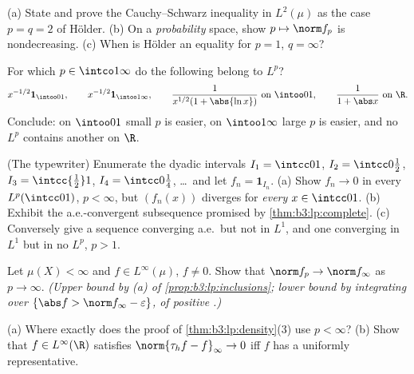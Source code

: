 \begin{exercise}[$\star$]\label{exo:b3:lp:1}
(a) State and prove the Cauchy--Schwarz inequality in
$L^2(\mu)$ as the case $p = q = 2$ of H\"older.
(b) On a \emph{probability} space, show $p \mapsto \norm f_p$
is nondecreasing.
(c) When is H\"older an equality for $p = 1$, $q = \infty$?
\end{exercise}

\begin{exercise}[$\star$]\label{exo:b3:lp:2}
For which $p \in \intco1\infty$ do the following belong to
$L^p$?
\[
x^{-1/2}\mathbf 1_{\intoo01},\qquad
x^{-1/2}\mathbf 1_{\intoo1\infty},\qquad
\frac{1}{x^{1/2}(1 + \abs{\ln x})}\ \text{on } \intoo01,
\qquad
\frac1{1 + \abs x}\ \text{on } \R .
\]
Conclude: on $\intoo01$ small $p$ is easier, on
$\intoo1\infty$ large $p$ is easier, and no $L^p$ contains
another on $\R$.
\end{exercise}

\begin{exercise}[$\star\star$]\label{exo:b3:lp:3}
(The typewriter) Enumerate the dyadic intervals $I_1 =
\intcc01$, $I_2 = \intcc0{\frac12}$, $I_3 = \intcc{\frac12}1$,
$I_4 = \intcc0{\frac14}$, \dots\ and let $f_n = \mathbf
1_{I_n}$.
(a) Show $f_n \to 0$ in every $L^p(\intcc01)$, $p < \infty$,
but $(f_n(x))$ diverges for \emph{every} $x \in \intcc01$.
(b) Exhibit the a.e.-convergent subsequence promised by
\cref{thm:b3:lp:complete}.
(c) Conversely give a sequence converging a.e.\ but not in
$L^1$, and one converging in $L^1$ but in no $L^p$, $p > 1$.
\end{exercise}

\begin{exercise}[$\star\star$]\label{exo:b3:lp:4}
Let $\mu(X) < \infty$ and $f \in L^\infty(\mu)$, $f \neq 0$.
Show that $\norm f_p \to \norm f_\infty$ as $p \to \infty$.
\emph{(Upper bound by (a) of \cref{prop:b3:lp:inclusions};
lower bound by integrating over $\{\abs f > \norm f_\infty -
\varepsilon\}$, of positive .)}
\end{exercise}

\begin{exercise}[$\star\star$]\label{exo:b3:lp:5}
(a) Where exactly does the proof of
\cref{thm:b3:lp:density}(3) use $p < \infty$?
(b) Show that $f \in L^\infty(\R)$ satisfies $\norm{\tau_hf -
f}_\infty \to 0$ iff $f$ has a uniformly 
representative.
\end{exercise}

